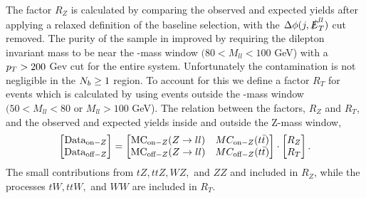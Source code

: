 The factor $R_Z$ is calculated by comparing the observed and expected \Zll{} yields after applying a relaxed definition of the baseline selection, with the $\Delta\phi(j,\slashed{E}_{T}^{ll})$ cut removed. The purity of the sample in improved by requiring the dilepton invariant mass to be near the \Z-mass window $(80<M_{ll}<100$ GeV) with a $p_{T}>200$ Gev cut for the entire system. Unfortunately the \ttbar{} contamination is not negligible in the $N_{b}\geq1$ region. To account for this we define a factor $R_T$ for \ttbar{} events which is calculated by using events outside the \Z-mass window $(50<M_{ll}<80$ or $M_{ll}>100$ GeV). The relation between the factors, $R_Z$ and $R_T$, and the observed and expected yields inside and outside the Z-mass window, 
\begin{equation}
\begin{bmatrix}
\text{Data}_{\text{on}-Z} \\
\text{Data}_{\text{off}-Z}
\end{bmatrix}
=
\begin{bmatrix}
\text{MC}_{\text{on}-Z}(Z\rightarrow ll) & MC_{\text{on}-Z}(t\bar{t}) \\
\text{MC}_{\text{off}-Z}(Z\rightarrow ll) & MC_{\text{off}-Z}(t\bar{t})
\end{bmatrix}
\cdot
\begin{bmatrix}
R_Z \\
R_T
\end{bmatrix}.
\end{equation}
The small contributions from $tZ, ttZ, WZ,$ and $ZZ$ and included in $R_Z$, while the processes $tW, ttW,$ and $WW$ are included in $R_T$. 


